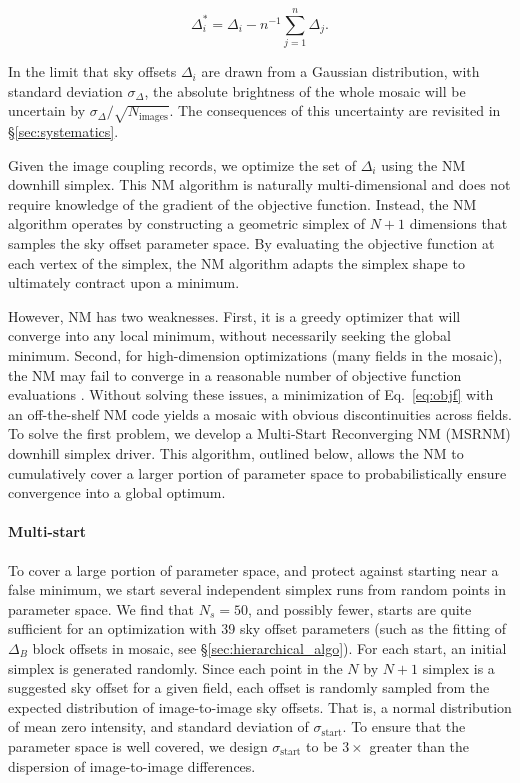 \documentclass[iop]{emulateapj}
\newcommand{\Eq}[1]{Eq.~\ref{eq:#1}}  %
\newcommand{\Sec}[1]{\S\ref{sec:#1}}  %
\begin{document}
\begin{equation}
    \Delta_i^* = \Delta_i - n^{-1}\sum_{j=1}^n \Delta_j.
    \label{eq:netzero}
\end{equation}

\noindent In the limit that sky offsets $\Delta_i$ are drawn from a Gaussian distribution, with standard deviation $\sigma_\Delta$, the absolute brightness of the whole mosaic will be uncertain by $\sigma_\Delta / \sqrt{N_\mathrm{images}}$.
The consequences of this uncertainty are revisited in \Sec{systematics}.

Given the image coupling records, we optimize the set of $\Delta_i$ using the NM downhill simplex.
This NM algorithm is naturally multi-dimensional and does not require knowledge of the gradient of the objective function.
Instead, the NM algorithm operates by constructing a geometric simplex of $N+1$ dimensions that samples the sky offset parameter space.
By evaluating the objective function at each vertex of the simplex, the NM algorithm adapts the simplex shape to ultimately contract upon a minimum.

However, NM has two weaknesses.
First, it is a greedy optimizer that will converge into any local minimum, without necessarily seeking the global minimum.
Second, for high-dimension optimizations (many fields in the mosaic), the NM may fail to converge in a reasonable number of objective function evaluations \citep{Neumann:2006}.
Without solving these issues, a minimization of \Eq{objf} with an off-the-shelf NM code yields a mosaic with obvious discontinuities across fields.
To solve the first problem, we develop a Multi-Start Reconverging NM (MSRNM) downhill simplex driver.
This algorithm, outlined below, allows the NM to cumulatively cover a larger portion of parameter space to probabilistically ensure convergence into a global optimum.

\paragraph{Multi-start} To cover a large portion of parameter space, and protect against starting near a false minimum, we start several independent simplex runs from random points in parameter space.
We find that $N_s=50$, and possibly fewer, starts are quite sufficient for an optimization with 39 sky offset parameters (such as the fitting of $\Delta_B$ block offsets in mosaic, see \Sec{hierarchical_algo}).
For each start, an initial simplex is generated randomly.
Since each point in the $N$ by $N+1$ simplex is a suggested sky offset for a given field, each offset is randomly sampled from the expected distribution of image-to-image sky offsets.
That is, a normal distribution of mean zero intensity, and standard deviation of $\sigma_\mathrm{start}$.
To ensure that the parameter space is well covered, we design $\sigma_\mathrm{start}$ to be $3\times$ greater than the dispersion of image-to-image differences.
\end{document}
